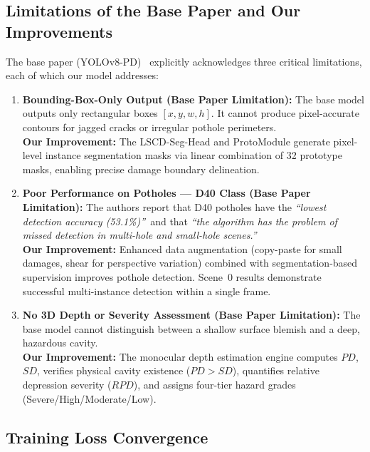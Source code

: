 \documentclass[conference]{IEEEtran}
\begin{document}
\subsection{Limitations of the Base Paper and Our Improvements}

The base paper (YOLOv8-PD)~\cite{zeng2024yolov8pd} explicitly acknowledges three critical limitations, each of which our model addresses:

\begin{enumerate}[leftmargin=*]
    \item \textbf{Bounding-Box-Only Output (Base Paper Limitation):} The base model outputs only rectangular boxes $[x, y, w, h]$. It cannot produce pixel-accurate contours for jagged cracks or irregular pothole perimeters. \\
    \textbf{Our Improvement:} The LSCD-Seg-Head and ProtoModule generate pixel-level instance segmentation masks via linear combination of 32 prototype masks, enabling precise damage boundary delineation.
    
    \item \textbf{Poor Performance on Potholes --- D40 Class (Base Paper Limitation):} The authors report that D40 potholes have the \textit{``lowest detection accuracy (53.1\%)''}~and that \textit{``the algorithm has the problem of missed detection in multi-hole and small-hole scenes.''}~\\
    \textbf{Our Improvement:} Enhanced data augmentation (copy-paste for small damages, shear for perspective variation) combined with segmentation-based supervision improves pothole detection. Scene~0 results demonstrate successful multi-instance detection within a single frame.
    
    \item \textbf{No 3D Depth or Severity Assessment (Base Paper Limitation):} The base model cannot distinguish between a shallow surface blemish and a deep, hazardous cavity. \\
    \textbf{Our Improvement:} The monocular depth estimation engine computes $PD$, $SD$, verifies physical cavity existence ($PD > SD$), quantifies relative depression severity ($RPD$), and assigns four-tier hazard grades (Severe/High/Moderate/Low).
\end{enumerate}


\subsection{Training Loss Convergence}
\end{document}
